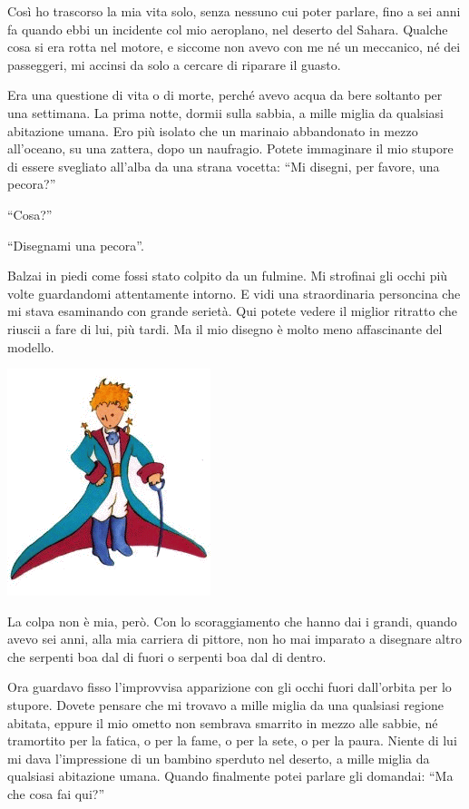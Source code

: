 \documentclass[11pt]{scrbook}
\begin{document}
Così ho trascorso la mia vita solo, senza nessuno cui poter parlare, fino a sei anni fa quando ebbi un incidente col mio aeroplano, nel deserto del Sahara. Qualche cosa si era rotta nel motore, e siccome non avevo con me né un meccanico, né dei passeggeri, mi accinsi da solo a cercare di riparare il guasto.

Era una questione di vita o di morte, perché avevo acqua da bere soltanto per una settimana. La prima notte, dormii sulla sabbia, a mille miglia da qualsiasi abitazione umana. Ero più isolato che un marinaio abbandonato in mezzo all'oceano, su una zattera, dopo un naufragio. Potete immaginare il mio stupore di essere svegliato all'alba da una strana vocetta: ``Mi disegni, per favore, una pecora?''

``Cosa?''

``Disegnami una pecora''.

Balzai in piedi come fossi stato colpito da un fulmine. Mi strofinai gli occhi più volte guardandomi attentamente intorno. E vidi una straordinaria personcina che mi stava esaminando con grande serietà. Qui potete vedere il miglior ritratto che riuscii a fare di lui, più tardi. Ma il mio disegno è molto meno affascinante del modello.

\begin{center}
\includegraphics{img/retrato}
\end{center}

La colpa non è mia, però. Con lo scoraggiamento che hanno dai i grandi, quando avevo sei anni, alla mia carriera di pittore, non ho mai imparato a disegnare altro che serpenti boa dal di fuori o serpenti boa dal di dentro.

Ora guardavo fisso l'improvvisa apparizione con gli occhi fuori dall'orbita per lo stupore. Dovete pensare che mi trovavo a mille miglia da una qualsiasi regione abitata, eppure il mio ometto non sembrava smarrito in mezzo alle sabbie, né tramortito per la fatica, o per la fame, o per la sete, o per la paura. Niente di lui mi dava l'impressione di un bambino sperduto nel deserto, a mille miglia da qualsiasi abitazione umana. Quando finalmente potei parlare gli domandai: ``Ma che cosa fai qui?''
\end{document}
